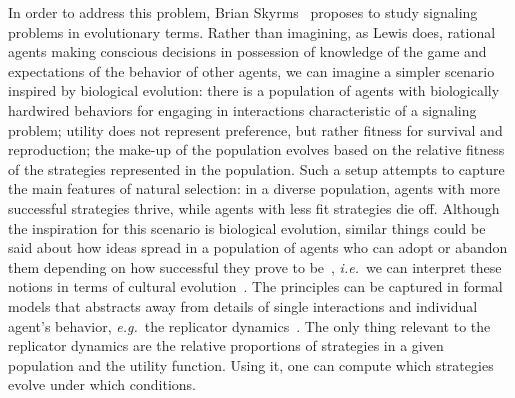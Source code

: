 \documentclass[a4paper]{article}
\begin{document}
In order to address this problem, Brian Skyrms~\parencite*{skyrms_evolution_1996} proposes to study signaling problems in evolutionary terms.
Rather than imagining, as Lewis does, rational agents making conscious decisions in possession of knowledge of the game and expectations of the behavior of other agents, we can imagine a simpler scenario inspired by biological evolution: there is a population of agents with biologically hardwired behaviors for engaging in interactions characteristic of a signaling problem; utility does not represent preference, but rather fitness for survival and reproduction; the make-up of the population evolves based on the relative fitness of the strategies represented in the population.
Such a setup attempts to capture the main features of natural selection: in a diverse population, agents with more successful strategies thrive, while agents with less fit strategies die off.
Although the inspiration for this scenario is biological evolution, similar things could be said about how ideas spread in a population of agents who can adopt or abandon them depending on how successful they prove to be~\parencite[\emph{e.g.}][]{BenzJager2006:Game-Theory-and,Pagel2009:Human-Language-,ThompsonKirby2016:Culture-Shapes-}, \emph{i.e.}~we can interpret these notions in terms of cultural evolution~\parencite[\emph{e.g.}][]{dawkins_selfish_1978,boyd_culture_1985}.
The principles can be captured in formal models that abstracts away from details of single interactions and individual agent's behavior, \emph{e.g.}~the replicator dynamics~\parencite{TaylorJonker1978:Evolutionary-St}.
The only thing relevant to the replicator dynamics are the relative proportions of strategies in a given population and the utility function.
Using it, one can compute which strategies evolve under which conditions.
\end{document}
